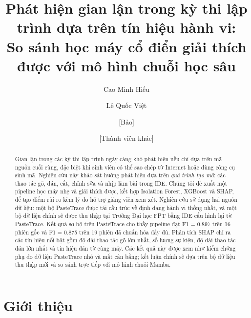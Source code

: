 \documentclass[runningheads]{llncs}
\begin{document}
\title{Phát hiện gian lận trong kỳ thi lập trình dựa trên tín hiệu hành vi:\\
So sánh học máy cổ điển giải thích được với mô hình chuỗi học sâu}


\author{Cao Minh Hiếu \and Lê Quốc Việt \and [Bảo] \and [Thành viên khác]}


\maketitle

\begin{abstract}
Gian lận trong các kỳ thi lập trình ngày càng khó phát hiện nếu chỉ dựa trên mã nguồn cuối cùng, đặc biệt khi sinh viên có thể sao chép từ Internet hoặc dùng công cụ sinh mã. Nghiên cứu này khảo sát hướng phát hiện dựa trên \emph{quá trình tạo mã}: các thao tác gõ, dán, cắt, chỉnh sửa và nhịp làm bài trong IDE. Chúng tôi đề xuất một pipeline học máy nhẹ và giải thích được, kết hợp Isolation Forest, XGBoost và SHAP, để tạo điểm rủi ro kèm lý do hỗ trợ giảng viên xem xét. Nghiên cứu sử dụng hai nguồn dữ liệu: một bộ PasteTrace được tái cấu trúc về định dạng hành vi thống nhất, và một bộ dữ liệu chính sẽ được thu thập tại Trường Đại học FPT bằng IDE cấu hình lại từ PasteTrace. Kết quả sơ bộ trên PasteTrace cho thấy pipeline đạt F1 = 0.897 trên 16 phiên gốc và F1 = 0.875 trên 19 phiên đã chuẩn hóa đầy đủ. Phân tích SHAP chỉ ra các tín hiệu nổi bật gồm độ dài thao tác gõ lớn nhất, số lượng sự kiện, độ dài thao tác dán lớn nhất và tín hiệu dán từ cùng máy. Các kết quả này được xem như kiểm chứng phụ do dữ liệu PasteTrace nhỏ và mất cân bằng; kết luận chính sẽ dựa trên bộ dữ liệu thu thập mới và so sánh trực tiếp với mô hình chuỗi Mamba.

\end{abstract}

\section{Giới thiệu}
\label{sec:intro}
\end{document}

